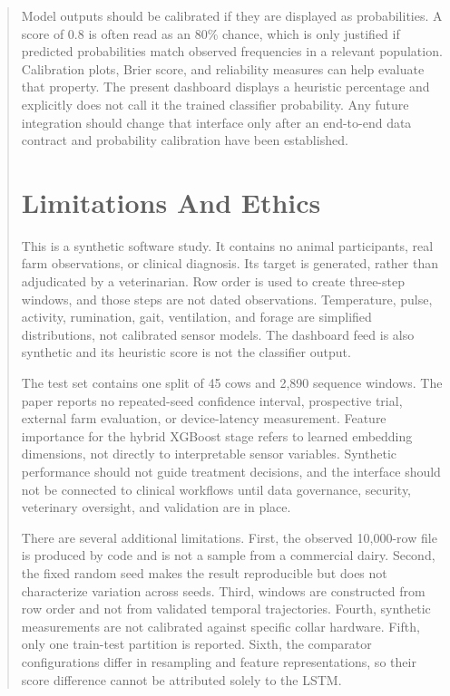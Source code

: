 \documentclass[journal]{IEEEtran}
\begin{document}
\begin{abstract}
Model outputs should be calibrated if they are displayed as probabilities. A score of 0.8 is often read as an 80\% chance, which is only justified if predicted probabilities match observed frequencies in a relevant population. Calibration plots, Brier score, and reliability measures can help evaluate that property. The present dashboard displays a heuristic percentage and explicitly does not call it the trained classifier probability. Any future integration should change that interface only after an end-to-end data contract and probability calibration have been established.

\section{Limitations And Ethics}

This is a synthetic software study. It contains no animal participants, real farm observations, or clinical diagnosis. Its target is generated, rather than adjudicated by a veterinarian. Row order is used to create three-step windows, and those steps are not dated observations. Temperature, pulse, activity, rumination, gait, ventilation, and forage are simplified distributions, not calibrated sensor models. The dashboard feed is also synthetic and its heuristic score is not the classifier output.

The test set contains one split of 45 cows and 2,890 sequence windows. The paper reports no repeated-seed confidence interval, prospective trial, external farm evaluation, or device-latency measurement. Feature importance for the hybrid XGBoost stage refers to learned embedding dimensions, not directly to interpretable sensor variables. Synthetic performance should not guide treatment decisions, and the interface should not be connected to clinical workflows until data governance, security, veterinary oversight, and validation are in place.

There are several additional limitations. First, the observed 10,000-row file is produced by code and is not a sample from a commercial dairy. Second, the fixed random seed makes the result reproducible but does not characterize variation across seeds. Third, windows are constructed from row order and not from validated temporal trajectories. Fourth, synthetic measurements are not calibrated against specific collar hardware. Fifth, only one train-test partition is reported. Sixth, the comparator configurations differ in resampling and feature representations, so their score difference cannot be attributed solely to the LSTM.


\end{abstract}
\end{document}
